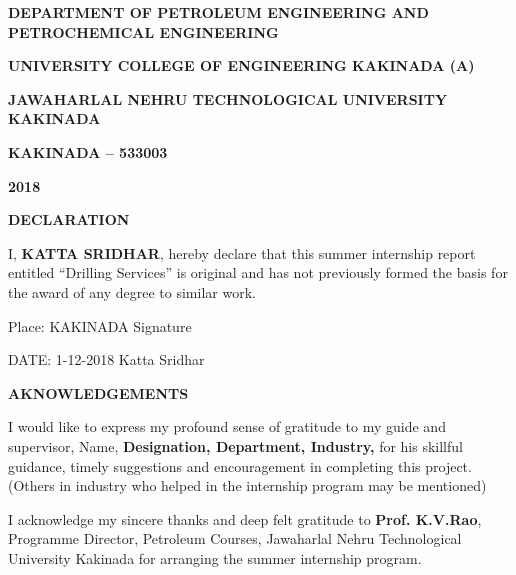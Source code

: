 \documentclass[11pt,a4paper]{article}
\begin{document}
\begin{titlepage}
\begin{center}
\vspace{1em}

\doublespacing

\large \textbf{DEPARTMENT OF PETROLEUM ENGINEERING AND \\ 
PETROCHEMICAL ENGINEERING}

\large \textbf{UNIVERSITY COLLEGE OF ENGINEERING KAKINADA (A)}

\large \textbf{JAWAHARLAL NEHRU TECHNOLOGICAL UNIVERSITY KAKINADA}

\large \textbf{KAKINADA – 533003}

\large \textbf{2018}

\end{center}
\end{titlepage}

\newpage

\begin{center}
\textbf{DECLARATION}
\end{center}

\vspace{4em}


I, \textbf{KATTA SRIDHAR}, hereby declare that this summer internship report entitled “Drilling Services” is original and has not previously formed the basis for the award of any degree to similar work.


\vspace{5em}

\noindent Place: KAKINADA  \hfill Signature     \hspace{0.02\textwidth}

\vspace{1em}

\noindent DATE: 1-12-2018  \hfill Katta Sridhar


\newpage

\begin{center}
\textbf{AKNOWLEDGEMENTS}
\end{center}


\vspace{1em}

I would like to express my profound sense of gratitude to my guide and supervisor, Name, \textbf{Designation, Department, Industry,} for his skillful guidance, timely suggestions and encouragement in completing this project. (Others in industry who helped in the internship program may be mentioned)

\vspace{1em}


I acknowledge my sincere thanks and deep felt gratitude to \textbf{Prof. K.V.Rao}, Programme Director, Petroleum Courses, Jawaharlal Nehru Technological University Kakinada for arranging the summer internship program.
\end{document}
